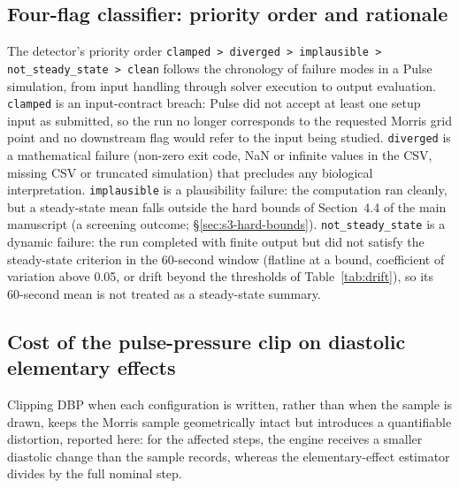 \documentclass[pdflatex,sn-nature]{sn-jnl}%
\newcommand{\mainref}[2]{#2}
\begin{document}
\subsection{Four-flag classifier: priority order and rationale}\label{sec:s3-detector-order}

The detector's priority order \texttt{clamped > diverged > implausible > not\_steady\_state > clean} follows the chronology of failure modes in a Pulse simulation, from input handling through solver execution to output evaluation. \texttt{clamped} is an input-contract breach: Pulse did not accept at least one setup input as submitted, so the run no longer corresponds to the requested Morris grid point and no downstream flag would refer to the input being studied. \texttt{diverged} is a mathematical failure (non-zero exit code, NaN or infinite values in the CSV, missing CSV or truncated simulation) that precludes any biological interpretation. \texttt{implausible} is a plausibility failure: the computation ran cleanly, but a steady-state mean falls outside the hard bounds of Section~\mainref{sec:methods-detector}{4.4} of the main manuscript (a screening outcome; \S\ref{sec:s3-hard-bounds}). \texttt{not\_steady\_state} is a dynamic failure: the run completed with finite output but did not satisfy the steady-state criterion in the 60-second window (flatline at a bound, coefficient of variation above 0.05, or drift beyond the thresholds of Table~\ref{tab:drift}), so its 60-second mean is not treated as a steady-state summary.

\subsection{Cost of the pulse-pressure clip on diastolic elementary effects}\label{sec:s3-clip-cost}

Clipping DBP when each configuration is written, rather than when the sample is drawn, keeps the Morris sample geometrically intact but introduces a quantifiable distortion, reported here: for the affected steps, the engine receives a smaller diastolic change than the sample records, whereas the elementary-effect estimator divides by the full nominal step.
\end{document}
